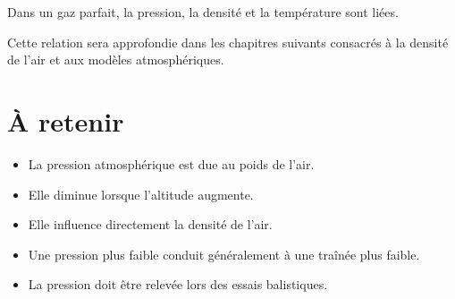 \begin{rigueur}

Dans un gaz parfait, la pression, la densité et la température sont liées.

Cette relation sera approfondie dans les chapitres suivants consacrés à la
densité de l'air et aux modèles atmosphériques.

\end{rigueur}

\section{À retenir}

\begin{aretenir}

\begin{itemize}
\item La pression atmosphérique est due au poids de l'air.
\item Elle diminue lorsque l'altitude augmente.
\item Elle influence directement la densité de l'air.
\item Une pression plus faible conduit généralement à une traînée plus
faible.
\item La pression doit être relevée lors des essais balistiques.
\end{itemize}

\end{aretenir}

